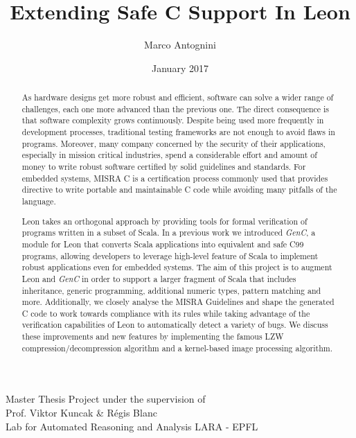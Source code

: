 \documentclass[a4paper,twoside]{article}
\title{Extending Safe C Support In Leon}
\date{January 2017}
\author{Marco Antognini}
\newcommand{\GenC}{\emph{GenC}\xspace}
\begin{document}
\maketitle

\vfill

\begin{abstract}

As hardware designs get more robust and efficient, software can solve a wider
range of challenges, each one more advanced than the previous one. The direct
consequence is that software complexity grows continuously. Despite being used
more frequently in development processes, traditional testing frameworks are not
enough to avoid flaws in programs. Moreover, many company concerned by the
security of their applications, especially in mission critical industries, spend
a considerable effort and amount of money to write robust software certified by
solid guidelines and standards. For embedded systems, MISRA C is a certification
process commonly used that provides directive to write portable and maintainable
C code while avoiding many pitfalls of the language.

Leon takes an orthogonal approach by providing tools for formal verification of
programs written in a subset of Scala. In a previous work we introduced \GenC, a
module for Leon that converts Scala applications into equivalent and safe C99
programs, allowing developers to leverage high-level feature of Scala to
implement robust applications even for embedded systems. The aim of this project
is to augment Leon and \GenC in order to support a larger fragment of Scala that
includes inheritance, generic programming, additional numeric types, pattern
matching and more. Additionally, we closely analyse the MISRA Guidelines and
shape the generated C code to work towards compliance with its rules while
taking advantage of the verification capabilities of Leon to automatically
detect a variety of bugs. We discuss these improvements and new features by
implementing the famous LZW compression/decompression algorithm and a
kernel-based image processing algorithm.

\end{abstract}

\vfill

\begin{center}
    Master Thesis Project under the supervision of \\
    Prof. Viktor Kuncak \& Régis Blanc \\
    Lab for Automated Reasoning and Analysis LARA - EPFL
\end{center}
\end{document}
